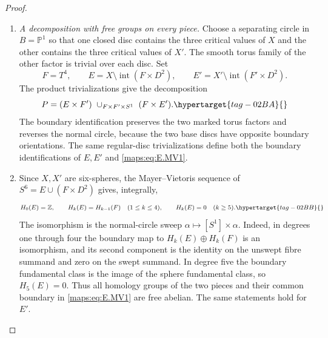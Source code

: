 \documentclass[11pt,a4paper]{article}
\numberwithin{equation}{section}
\theoremstyle{definition}
\begin{document}
\begin{proof}
\begin{enumerate}[label=\arabic*.,leftmargin=*]
\item \emph{A decomposition with free groups on every piece.}
Choose a separating circle in $B=\mathbb P^1$ so that one closed
disc contains the three critical values of $X$ and the other
contains the three critical values of $X'$. The smooth torus
family of the other factor is trivial over each disc. Set
\[
 F=T^4,\qquad E=X\setminus\operatorname{int}(F\times D^2),
 \qquad E'=X'\setminus\operatorname{int}(F'\times D^2).
\]
The product trivializations give the decomposition
\begin{equation}
 P=(E\times F')\ \cup_{F\times F'\times S^1}\ (F\times E').
 \hypertarget{tag-02BA}{}\label{maps:eq:E.MV1}
\end{equation}
The boundary identification preserves the two marked torus factors
and reverses the normal circle, because the two base discs have
opposite boundary orientations. The same regular-disc trivializations define both the
boundary identifications of $E,E'$ and \eqref{maps:eq:E.MV1}.

\item Since $X,X'$ are six-spheres, the Mayer--Vietoris sequence of
$S^6=E\cup(F\times D^2)$ gives, integrally,
\begin{equation}
 H_0(E)=\mathbb Z,\qquad H_k(E)=H_{k-1}(F)\quad(1\leq k\leq4),
 \qquad H_k(E)=0\quad(k\geq5).
 \hypertarget{tag-02BB}{}\label{maps:eq:E.MV2}
\end{equation}
The isomorphism is the normal-circle sweep
$\alpha\mapsto[S^1]\times\alpha$. Indeed, in degrees one
through four the boundary map to $H_k(E)\oplus H_k(F)$ is
an isomorphism, and its second component is the identity on
the unswept fibre summand and zero on the swept summand.
In degree five the boundary fundamental class is the image
of the sphere fundamental class, so $H_5(E)=0$.
Thus all homology groups of the two pieces and their common
boundary in \eqref{maps:eq:E.MV1} are free abelian. The same statements hold
for $E'$.


\end{enumerate}
\end{proof}
\end{document}
